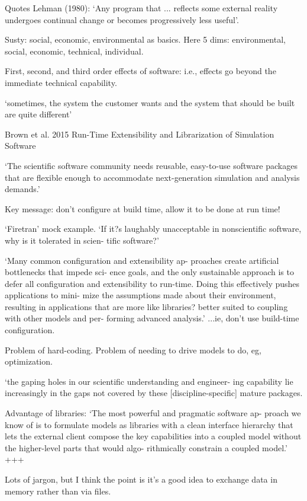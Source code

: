 \documentclass[12pt]{amsart}
\begin{document}
Quotes Lehman (1980): `Any program that ... reflects some external reality undergoes continual change or becomes progressively less useful'.

Susty: social, economic, environmental as basics. Here 5 dims: environmental, social, economic, technical, individual. 

First, second, and third order effects of software: i.e., effects go beyond the immediate technical capability.

`sometimes, the system the customer wants and the system that should be built are quite different'


Brown et al. 2015 Run-Time Extensibility and Librarization of Simulation Software

`The scientific software community needs reusable, easy-to-use software packages that are flexible enough to accommodate next-generation simulation and analysis demands.'

Key message: don't configure at build time, allow it to be done at run time!

`Firetran' mock example. `If it?s laughably unacceptable in nonscientific software, why is it tolerated in scien- tific software?'

`Many common configuration and extensibility ap- proaches create artificial bottlenecks that impede sci- ence goals, and the only sustainable approach is to defer all configuration and extensibility to run-time. Doing this effectively pushes applications to mini- mize the assumptions made about their environment, resulting in applications that are more like libraries? better suited to coupling with other models and per- forming advanced analysis.' ...ie, don't use build-time configuration.

Problem of hard-coding. Problem of needing to drive models to do, eg, optimization. 

`the gaping holes in our scientific understanding and engineer- ing capability lie increasingly in the gaps not covered by these [discipline-specific] mature packages.

Advantage of libraries: `The most powerful and pragmatic software ap- proach we know of is to formulate models as libraries with a clean interface hierarchy that lets the external client compose the key capabilities into a coupled model without the higher-level parts that would algo- rithmically constrain a coupled model.' +++

Lots of jargon, but I think the point is it's a good idea to exchange data in memory rather than via files.
\end{document}
